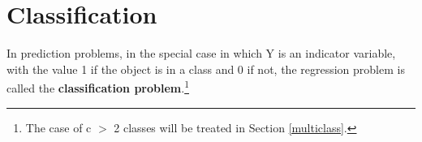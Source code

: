 \chapter{Classification} 
\label{chap:class}

% 
% 
% 
% 
% 
% 
% 
% 
% 

In prediction problems, in the special case in which Y is an indicator
variable, with the value 1 if the object is in a class and 0 if not, the
regression problem is called the {\bf classification
problem}.\footnote{The case of c $>$ 2 classes will be treated in
Section \ref{multiclass}.}

